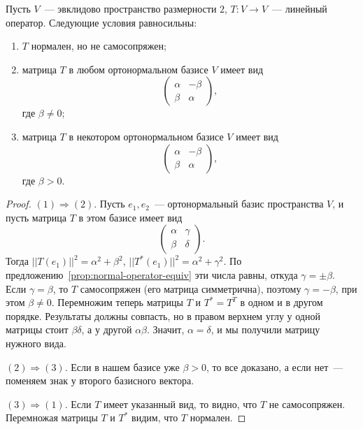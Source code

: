 \begin{proposition}\label{prop:real-normal-not-self-adjoint-dim-2}
Пусть $V$~--- эвклидово пространство размерности $2$,
$T\colon V\to V$~--- линейный оператор.
Следующие условия равносильны:
\begin{enumerate}
\item $T$ нормален, но не самосопряжен;
\item матрица $T$ в любом ортонормальном базисе $V$ имеет вид
$$
\begin{pmatrix} \alpha & -\beta \\ \beta & \alpha\end{pmatrix},
$$
где $\beta\neq 0$;
\item матрица $T$ в некотором ортонормальном базисе $V$ имеет вид
$$
\begin{pmatrix} \alpha & -\beta \\ \beta & \alpha\end{pmatrix},
$$
где $\beta > 0$.
\end{enumerate}
\end{proposition}
\begin{proof}
$(1)\Rightarrow (2)$. Пусть $e_1,e_2$~--- ортонормальный базис
пространства $V$, и пусть матрица $T$ в этом базисе имеет вид
$$
\begin{pmatrix}\alpha & \gamma\\\beta & \delta\end{pmatrix}.
$$
Тогда $||T(e_1)||^2 = \alpha^2 + \beta^2$, $||T^*(e_1)||^2 = \alpha^2 + \gamma^2$.
По предложению~\ref{prop:normal-operator-equiv} эти числа равны,
откуда $\gamma = \pm \beta$. Если $\gamma=\beta$, то $T$ самосопряжен (его матрица
симметрична), поэтому $\gamma = -\beta$, при этом $\beta\neq 0$.
Перемножим теперь матрицы
$T$ и $T^*= T^T$ в одном и в другом порядке. Результаты должны
совпасть, но в правом верхнем углу у одной матрицы стоит $\beta\delta$, а у
другой $\alpha\beta$. Значит, $\alpha=\delta$, и мы получили матрицу нужного вида.

$(2)\Rightarrow (3)$. Если в нашем базисе уже $\beta>0$, то все доказано,
а если нет~--- поменяем знак у второго базисного вектора.

$(3)\Rightarrow (1)$. Если $T$ имеет указанный вид, то видно, что $T$
не самосопряжен. Перемножая матрицы $T$ и $T^*$ видим, что $T$
нормален.
\end{proof}

